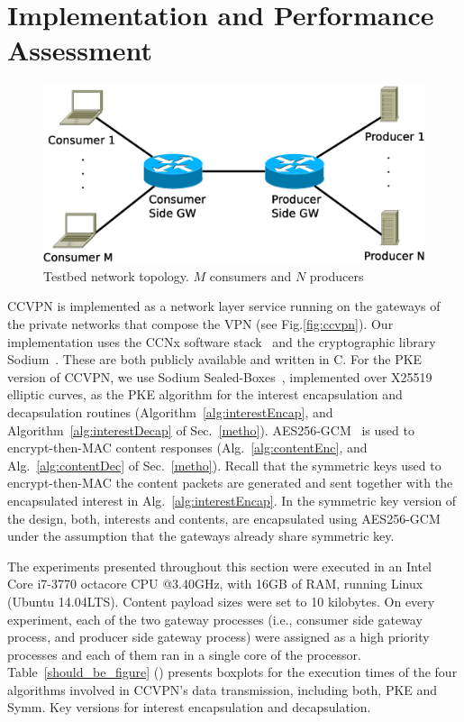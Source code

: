 \section{Implementation and Performance Assessment}

\begin{figure}[]
\centering
\includegraphics[width=\columnwidth]{images/testnet.eps}
\caption{Testbed network topology. $M$ consumers and $N$ producers}\label{testnet}
\end{figure}

CCVPN is implemented as a network layer service running on the gateways of the private networks that compose the VPN (see Fig.\ref{fig:ccvpn}).
Our implementation uses the CCNx software stack~\cite{CCNxGithub} and the cryptographic library Sodium~\cite{sodiumGithub}. These are both publicly available and written in C.
For the PKE version of CCVPN, we use Sodium Sealed-Boxes~\cite{bernstein2006curve25519}, implemented over X25519 elliptic curves, as the PKE algorithm for the interest encapsulation and decapsulation routines (Algorithm~\ref{alg:interestEncap}, and Algorithm~\ref{alg:interestDecap} of Sec.~\ref{metho}).
AES256-GCM~\cite{dworkin2007recommendation} is used to encrypt-then-MAC content responses (Alg.~\ref{alg:contentEnc}, and Alg.~\ref{alg:contentDec} of Sec.~\ref{metho}).
Recall that the symmetric keys used to encrypt-then-MAC the content packets are generated and sent together with the encapsulated interest in Alg.~\ref{alg:interestEncap}.
In the symmetric key version of the design, both, interests and contents, are encapsulated using AES256-GCM under the assumption that the gateways already share symmetric key.


The experiments presented throughout this section were executed in an Intel Core i7-3770 octacore CPU @3.40GHz, with 16GB of RAM, running Linux (Ubuntu 14.04LTS). Content payload sizes were set to 10 kilobytes.
On every experiment, each of the two gateway processes (i.e., consumer side gateway process, and producer side gateway process) were assigned as a high priority processes and each of them ran in a single core of the processor.
Table~\ref{should_be_figure} () presents boxplots for the execution times of the four algorithms involved in CCVPN's data transmission, including both, PKE and Symm. Key versions for interest encapsulation and decapsulation.

